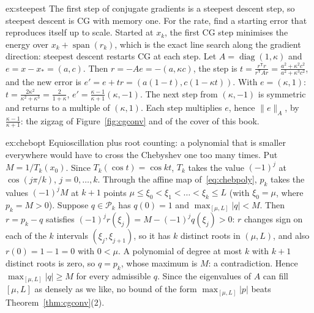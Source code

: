 \begin{solution}{ex:steepest}
\idea The first step of conjugate gradients is a steepest descent step, so steepest descent is CG with memory one. For the rate, find a starting error that reproduces itself up to scale.
\writeup Started at $x_{k}$, the first CG step minimises the energy over $x_k+\operatorname{span}(r_k)$, which is the exact line search along the gradient direction: steepest descent restarts CG at each step.
Let $A=\operatorname{diag}(1,\kappa)$ and $e=x-x_*=(a,c)$. Then $r=-Ae=-(a,\kappa c)$, the step is $t=\frac{r^{\mathsf T}r}{r^{\mathsf T}Ar}=\frac{a^2+\kappa^2c^2}{a^2+\kappa^3c^2}$, and the new error is
$e'=e+tr=(a(1-t),c(1-\kappa t))$. With $e=(\kappa,1)$: $t=\frac{2\kappa^2}{\kappa^2+\kappa^3}=\frac2{1+\kappa}$, $e'=\frac{\kappa-1}{\kappa+1}(\kappa,-1)$. The next step from $(\kappa,-1)$ is symmetric and returns to
a multiple of $(\kappa,1)$. Each step multiplies $e$, hence $\|e\|_A$, by $\frac{\kappa-1}{\kappa+1}$: the zigzag of Figure~\ref{fig:cgconv} and of the cover of this book.
\end{solution}

\begin{solution}{ex:chebopt}
\idea Equioscillation plus root counting: a polynomial that is smaller everywhere would have to cross the Chebyshev one too many times.
\writeup Put $M=1/T_k(x_0)$. Since $T_k(\cos t)=\cos kt$, $T_k$ takes the value $(-1)^j$ at $\cos(j\pi/k)$, $j=0,\dots,k$. Through the affine map of~\eqref{eq:chebpoly}, $p_k$ takes the values
$(-1)^jM$ at $k+1$ points $\mu\le\xi_0<\xi_1<\dots<\xi_k\le L$ (with $\xi_0=\mu$, where $p_k=M>0$). Suppose $q\in\mathcal P_k$ has $q(0)=1$ and $\max_{[\mu,L]}|q|<M$. Then
$r=p_k-q$ satisfies $(-1)^jr(\xi_j)=M-(-1)^jq(\xi_j)>0$: $r$ changes sign on each of the $k$ intervals $(\xi_j,\xi_{j+1})$, so it has $k$ distinct roots in $(\mu,L)$, and also
$r(0)=1-1=0$ with $0<\mu$. A polynomial of degree at most $k$ with $k+1$ distinct roots is zero, so $q=p_k$, whose maximum is $M$: a contradiction. Hence $\max_{[\mu,L]}|q|\ge M$
for every admissible $q$. Since the eigenvalues of $A$ can fill $[\mu,L]$ as densely as we like, no bound of the form $\max_{[\mu,L]}|p|$ beats Theorem~\ref{thm:cgconv}(2).
\end{solution}

